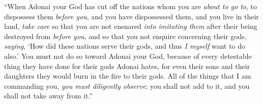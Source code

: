 \begin{biblechapter}
\verse “When Adonai your God has cut off the nations whom you are \textit{about to go to}, to dispossess them \textit{before you}, and you have dispossessed them, and you live in their land,
\verse \textit{take care} so that you are not ensnared \textit{into imitating them} after their being destroyed from \textit{before you}, and so that you not enquire concerning their gods, \textit{saying}, ‘How did these nations serve their gods, and thus \textit{I myself} want to do also.’
\verse You must not do so toward Adonai your God, because of every detestable thing they have done for their gods Adonai hates, for even their sons and their daughters they would burn in the fire to their gods.
\verse  All of the things that I am commanding you, \textit{you must diligently observe}; you shall not add to it, and you shall not take away from it.”
\end{biblechapter}

